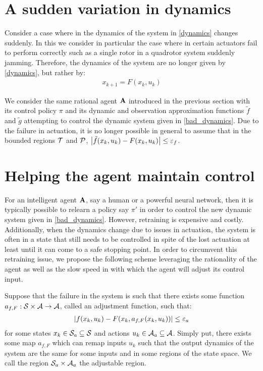 \documentclass[a4paper,10pt]{article}
\begin{document}
\section{A sudden variation in dynamics}
Consider a case where in the dynamics of the system in \eqref{dynamics} changes suddenly. In this we consider in particular the case where in certain actuators fail to perform correctly such as a single rotor in a quadrotor system suddenly jamming. Therefore, the dynamics of the system are no longer given by \eqref{dynamics}, but rather by:
\begin{align}
 x_{k+1} = F(x_k,u_k) \label{bad_dynamics}
\end{align}


We consider the same rational agent $\mathbf{A}$ introduced in the previous section with its control policy $\pi$ and its dynamic and observation approximation functions $\tilde f$ and $\tilde g$ attempting to control the dynamic system given in \eqref{bad_dynamics}. Due to the failure in actuation, it is no longer possible in general to assume that in the bounded regions $\mathcal{T}$ and $\mathcal{P}$, 
$
 {\left\vert \tilde f(x_k,u_k) - F(x_k,u_k) \right\vert} \leq \varepsilon_f
$.

\section{Helping the agent maintain control}
For an intelligent agent $\mathbf{A}$, say a human or a powerful neural network, then it is typically possible to relearn a policy say $\pi'$ in order to control the new dynamic system given in \eqref{bad_dynamics}. However, retraining is expensive and costly. Additionally, when the dynamics change due to issues in actuation, the system is often in a state that still needs to be controlled in spite of the lost actuation at least until it can come to a safe stopping point. In order to circumvent this retraining issue, we propose the following scheme leveraging the rationality of the agent as well as the slow speed in with which the agent will adjust its control input.

Suppose that the failure in the system is such that there exists some function $a_{f,F}: \mathcal{S} \times \mathcal{A} \rightarrow \mathcal{A}$, called an adjustment function, such that:
\begin{align*} 
 {\left\vert f(x_k, u_k) - F(x_k, a_{f,F}(x_k,u_k)) \right\vert} \leq \varepsilon_a
\end{align*}
for some states $x_k \in \mathcal{S}_a \subseteq \mathcal{S}$ and actions $u_k \in \mathcal{A}_a \subseteq \mathcal{A}$. Simply put, there exists some map $a_{f,F}$ which can remap inputs $u_k$ such that the output dynamics of the system are the same for some inputs and in some regions of the state space. We call the region $\mathcal{S}_a \times \mathcal{A}_a$ the adjustable region.
\end{document}
